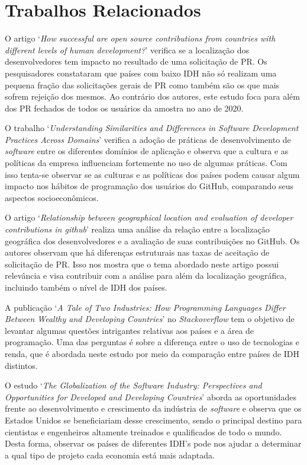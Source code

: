 \documentclass[12pt]{article}
\begin{document}
\section{Trabalhos Relacionados}\label{sec:relatedworks}

O artigo `\textit{How successful are open source contributions from countries with different levels of human development?}' \cite{Furtado2021} verifica se a localização dos desenvolvedores tem impacto no resultado de uma solicitação de PR. Os pesquisadores constataram que países com baixo IDH não só realizam uma pequena fração das solicitações gerais de PR como também são os que mais sofrem rejeição dos mesmos. Ao contrário dos autores, este estudo foca para além dos PR fechados de todos os usuários da amostra no ano de 2020.

O trabalho `\textit{Understanding Similarities and Differences in Software Development Practices Across Domains}' \cite{Viggiato2019} verifica a adoção de práticas de desenvolvimento de \textit{software} entre os diferentes domínios de aplicação e observa que a cultura e as políticas da empresa influenciam fortemente no uso de algumas práticas. Com isso tenta-se observar se as culturas e as políticas dos países podem causar algum impacto nos hábitos de programação dos usuários do GitHub, comparando seus aspectos socioeconômicos.

O artigo `\textit{Relationship between geographical location and evaluation of developer contributions in github}' \cite{Rastogi2018} realiza uma análise da relação entre a localização geográfica dos desenvolvedores e a avaliação de suas contribuições no GitHub. Os autores observam que há diferenças estruturais nas taxas de aceitação de solicitação de PR. Isso nos mostra que o tema abordado neste artigo possui relevância e visa contribuir com a análise para além da localização geográfica, incluindo também o nível de IDH dos países.

A publicação `\textit{A Tale of Two Industries: How Programming Languages Differ Between Wealthy and Developing Countries}' \cite{Robinson2017} no \textit{Stackoverflow} tem o objetivo de levantar algumas questões intrigantes relativas aos países e a área de programação. Uma das perguntas é sobre a diferença entre o uso de tecnologias e renda, que é abordada neste estudo por meio da comparação entre países de IDH distintos.


O estudo `\textit{The Globalization of the Software Industry: Perspectives and Opportunities for Developed and Developing Countries}' \cite{Arora2005} aborda as oportunidades frente ao desenvolvimento e crescimento da indústria de \textit{software} e observa que os Estados Unidos se beneficiariam desse crescimento, sendo o principal destino para cientistas e engenheiros altamente treinados e qualificados de todo o mundo. Desta forma, observar os países de diferentes IDH's pode nos ajudar a determinar a qual tipo de projeto cada economia está mais adaptada.
\end{document}
